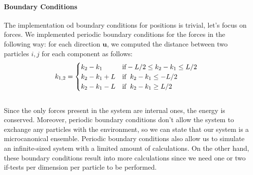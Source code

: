 \documentclass[10pt,a4paper,titlepage]{article}
\begin{document}
\paragraph{Boundary Conditions} The implementation od boundary conditions for positions is trivial, let's focus on forces. We implemented periodic boundary conditions for the forces in the following way: for each direction $\textbf{u}$, we computed the distance between two particles $i,j$ for each component as follows: 
\begin{equation}
k_{1,2} = \begin{cases} 
k_2-k_1   & \mbox{if} -L/2 \leq k_2-k_1 \leq L/2\\ 
k_2-k_1 + L  & \mbox{if} \hspace{0.2cm} k_2-k_1 \leq -L/2\\
k_2-k_1 - L  & \mbox{if} \hspace{0.2cm} k_2-k_1 \geq L/2 \\
\end{cases}
\end{equation}
\\ Since the only forces present in the system are internal ones, the energy is conserved. Moreover, periodic boundary conditions don't allow the system to exchange any particles with the environment, so we can state that our system is a microcanonical ensemble. Periodic boundary conditions also allow us to simulate an infinite-sized system with a limited amount of calculations. On the other hand, these boundary conditions result into more calculations since we need one or two if-tests per dimension per particle to be performed.  
\end{document}
